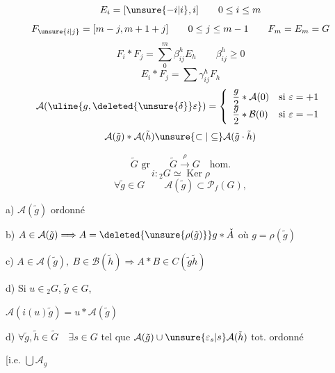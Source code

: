 \[
E_i=[\unsure{-i|i},i]\qquad0\leq i\leq m
\]
\[
F_{\unsure{i|j}}=[m-j,m+1+j]\qquad0\leq j\leq m-1\qquad F_m=E_m=G
\]
\inserted{\[
E_i\ast E_j=\sum\alpha_{ij}^h E_h\qquad\alpha_{ij}^h\geq0
\]}
\[
F_i\ast F_j=\sum_0^m\beta_{ij}^h E_h\qquad\beta_{ij}^h\geq0
\]
\[
E_i\ast F_j=\sum\gamma_{ij}^h F_h
\]
\[
\mathcal A(\uline{g,\deleted{\unsure{\delta}}\varepsilon})=
\left\{\begin{array}{ll}
\dfrac g2\ast\mathcal A(0)&\text{si }\varepsilon=+1\\
\dfrac g2\ast\mathcal B(0)&\text{si }\varepsilon=-1
\end{array}\right.
\]
\[
\mathcal A(\tilde g)\ast\mathcal A(\tilde h)\unsure{\subset|\subseteq}\mathcal A(\tilde g\cdot\tilde h)
\]

\[
\tilde G\text{ gr}\qquad\tilde G\xrightarrow{\rho}G\quad\text{hom.}
\]
\[
i:{}_2G\simeq\operatorname{Ker}\rho
\]
\[
\forall\tilde g\in G\qquad\mathcal A(\tilde g)\subset\mathcal P_f(G),
\]

a) $\mathcal A(\tilde g)$  ordonné

b) $A\in\mathcal A(\tilde g)\Longrightarrow A=\deleted{\unsure{\rho(\tilde g)}}g\ast\check A$ où $g=\rho(\tilde g)$

c) $A\in\mathcal A(\tilde g),\ B\in\mathcal B(\tilde h)\Longrightarrow A\ast B\in C(\tilde g\tilde h)$

d) Si $u\in{}_2G$, $\tilde g\in G$, \unsure{$\ldots$}

$\mathcal A(i(u)\tilde g)=u\ast\mathcal A(\tilde g)$

d) $\forall\tilde g,\tilde h\in\tilde G\quad\exists s\in G$ tel que $\mathcal A(\tilde g)\cup\unsure{\varepsilon_s|s}\mathcal A(\tilde h)$ tot. ordonné

[i.e. $\bigcup\mathcal A_g$
